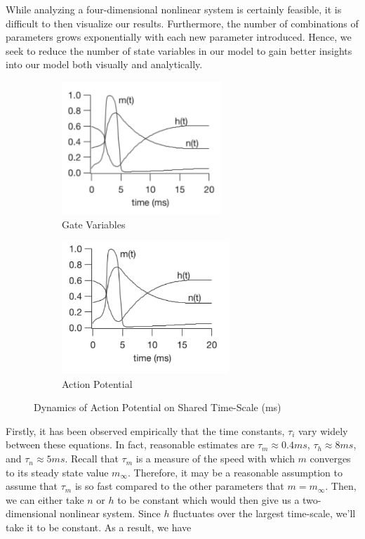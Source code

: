 \documentclass{article}
\begin{document}
While analyzing a four-dimensional nonlinear system is certainly feasible, it is difficult to then visualize our results. Furthermore, the number of combinations of parameters grows exponentially with each new parameter introduced. Hence, we seek to reduce the number of state variables in our model to gain better insights into our model both visually and analytically. 

\begin{figure}[h]
\centering
\begin{subfigure}{.5\textwidth}
	\centering
	\includegraphics[height=5cm]{keener1.png}
	\caption{Gate Variables}
\end{subfigure}%
\begin{subfigure}{.5\textwidth}
	\centering
	\includegraphics[height=5cm]{keener2.png}
	\caption{Action Potential}
\end{subfigure}
	\caption{Dynamics of Action Potential on Shared Time-Scale (ms)}
	\label{fig:keen}
\end{figure}


Firstly, it has been observed empirically that the time constants, $\tau_i$ vary widely between these equations. In fact, reasonable estimates are $\tau_m \approx 0.4 ms$, $\tau_h \approx 8 ms$, and $\tau_n \approx 5 ms$.\cite{monster} Recall that $\tau_m$ is a measure of the speed with which $m$ converges to its steady state value $m_\infty$. Therefore, it may be a reasonable assumption to assume that $\tau_m$ is so fast compared to the other parameters that $m = m_\infty$. Then, we can either take $n$ or $h$ to be constant which would then give us a two-dimensional nonlinear system. Since $h$ fluctuates over the largest time-scale, we'll take it to be constant. As a result, we have 
\end{document}
